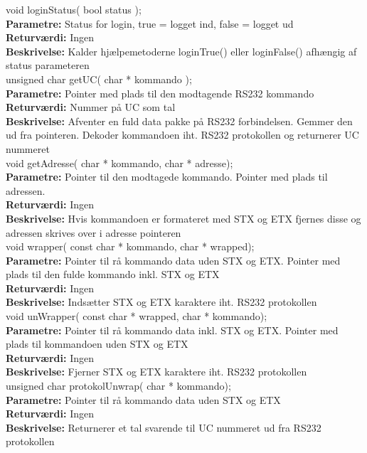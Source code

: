 void loginStatus( bool status ); \\
\textbf{Parametre:} Status for login, true = logget ind, false = logget ud  \\
\textbf{Returværdi:} Ingen \\
\textbf{Beskrivelse:} Kalder hjælpemetoderne loginTrue() eller loginFalse() afhængig af status parameteren \\

unsigned char getUC( char * kommando ); \\
\textbf{Parametre:} Pointer med plads til den modtagende RS232 kommando \\
\textbf{Returværdi:} Nummer på UC som tal \\
\textbf{Beskrivelse:} Afventer en fuld data pakke på RS232 forbindelsen. Gemmer den ud fra pointeren. Dekoder kommandoen iht. RS232 protokollen og returnerer UC nummeret \\

void getAdresse( char * kommando, char * adresse); \\
\textbf{Parametre:} Pointer til den modtagede kommando. Pointer med plads til adressen. \\
\textbf{Returværdi:} Ingen \\
\textbf{Beskrivelse:} Hvis kommandoen er formateret med STX og ETX fjernes disse og adressen skrives over i adresse pointeren \\

void wrapper( const char * kommando, char * wrapped); \\
\textbf{Parametre:} Pointer til rå kommando data uden STX og ETX. Pointer med plads til den fulde kommando inkl. STX og ETX \\
\textbf{Returværdi:} Ingen \\
\textbf{Beskrivelse:} Indsætter STX og ETX karaktere iht. RS232 protokollen\\

void unWrapper( const char * wrapped, char * kommando); \\
\textbf{Parametre:} Pointer til rå kommando data inkl. STX og ETX. Pointer med plads til kommandoen uden STX og ETX \\
\textbf{Returværdi:} Ingen \\
\textbf{Beskrivelse:} Fjerner STX og ETX karaktere iht. RS232 protokollen\\

unsigned char protokolUnwrap( char * kommando); \\
\textbf{Parametre:} Pointer til rå kommando data uden STX og ETX \\
\textbf{Returværdi:} Ingen \\
\textbf{Beskrivelse:} Returnerer et tal svarende til UC nummeret ud fra RS232 protokollen \\

